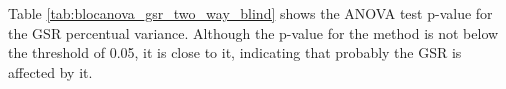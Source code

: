 Table \ref{tab:blocanova_gsr_two_way_blind} shows the ANOVA test p-value for the GSR percentual variance. Although the p-value for the method is not below the threshold of 0.05, it is close to it, indicating that probably the GSR is affected by it. 





\FloatBarrier

